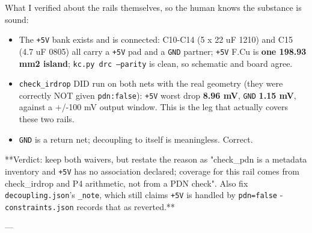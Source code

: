 \documentclass[11pt,a4paper]{article}
\begin{document}
What I verified about the rails themselves, so the human knows the substance is sound:

\begin{itemize}
\item The \texttt{+5V} bank exists and is connected: C10-C14 (5 x 22 uF 1210) and C15 (4.7 uF 0805)
all carry a \texttt{+5V} pad and a \texttt{GND} partner; \texttt{+5V} F.Cu is \textbf{one 198.93 mm2 island};
\texttt{kc.py drc --parity} is clean, so schematic and board agree.
\item \texttt{check\_irdrop} DID run on both nets with the real geometry (they were correctly NOT
given \texttt{pdn:false}): \texttt{+5V} worst drop \textbf{8.96 mV}, \texttt{GND} \textbf{1.15 mV}, against a
+/-100 mV output window. This is the leg that actually covers these two rails.
\item \texttt{GND} is a return net; decoupling to itself is meaningless. Correct.
\end{itemize}
{*}{*}Verdict: keep both waivers, but restate the reason as "check\_pdn is a metadata inventory and \texttt{+5V} has no association declared; coverage for this rail comes from check\_irdrop and P4 arithmetic, not from a PDN check". Also fix \texttt{decoupling.json}'s \texttt{\_note}, which still claims \texttt{+5V} is handled by \texttt{pdn=false} - \texttt{constraints.json} records that as reverted.{*}{*}

---
\end{document}
